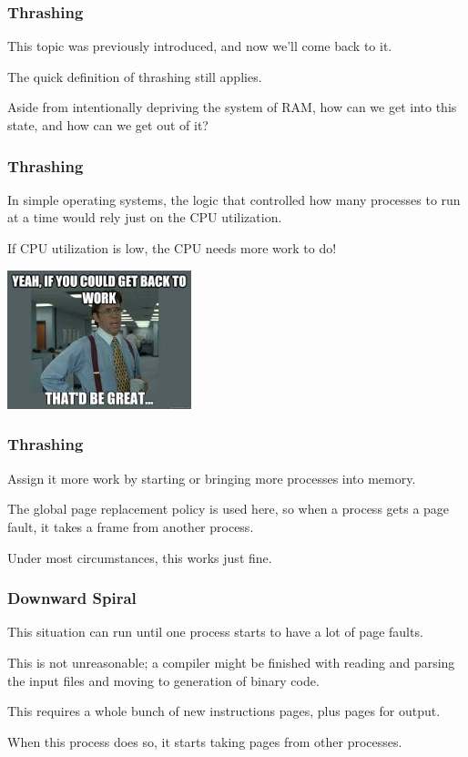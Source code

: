 \begin{frame}
\frametitle{Thrashing}
This topic was previously introduced, and now we'll come back to it.

The quick definition of thrashing still applies.

Aside from intentionally depriving the system of RAM, how can we get into this state, and how can we get out of it?


\end{frame}

\begin{frame}
\frametitle{Thrashing}

In simple operating systems, the logic that controlled how many processes to run at a time would rely just on the CPU utilization. 

If CPU utilization is low, the CPU needs more work to do! 

\begin{center}
	\includegraphics[width=0.4\textwidth]{images/backtowork.jpg}
\end{center}

\end{frame}

\begin{frame}
\frametitle{Thrashing}

Assign it more work by starting or bringing more processes into memory. 

The global page replacement policy is used here, so when a process gets a page fault, it takes a frame from another process. 

Under most circumstances, this works just fine.

\end{frame}

\begin{frame}
\frametitle{Downward Spiral}

This situation can run until one process starts to have a lot of page faults. 

This is not unreasonable; a compiler might be finished with reading and parsing the input files and moving to generation of binary code. 

This requires a whole bunch of new instructions pages, plus pages for output. 

When this process does so, it starts taking pages from other processes.

\end{frame}

